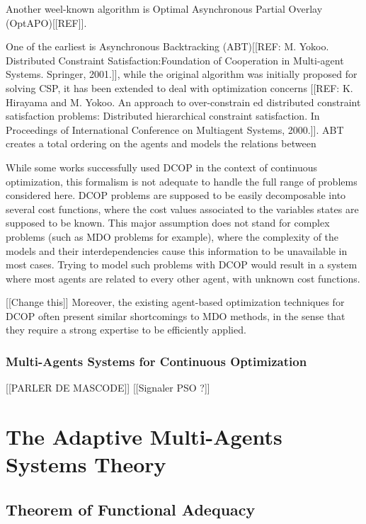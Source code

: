 Another weel-known algorithm is Optimal Asynchronous Partial Overlay (OptAPO)[[REF]]. 

 One of the earliest is Asynchronous Backtracking (ABT)[[REF: M. Yokoo. Distributed Constraint Satisfaction:Foundation of Cooperation in Multi-agent Systems. Springer, 2001.]], while the original algorithm was initially proposed for solving CSP, it has been extended to deal with optimization concerns [[REF: K. Hirayama and M. Yokoo. An approach to over-constrain ed distributed constraint satisfaction problems: Distributed hierarchical constraint satisfaction. In Proceedings of International Conference on Multiagent Systems, 2000.]]. ABT creates a total ordering on the agents and models the relations between 

While some works successfully used DCOP in the context of continuous optimization\cite{stranders2009decentralised}, this formalism is not adequate to handle the full range of problems considered here. DCOP problems are supposed to be easily decomposable into several cost functions, where the cost values associated to the variables states are supposed to be known. This major assumption does not stand for complex problems (such as MDO problems for example), where the complexity of the models and their interdependencies cause this information to be unavailable in most cases. Trying to model such problems with DCOP would result in a system where most agents are related to every other agent, with unknown cost functions.

[[Change this]]
Moreover, the existing agent-based optimization techniques for DCOP often present similar shortcomings to MDO methods, in the sense that they require a strong expertise to be efficiently applied\cite{Ka2011.6}.

\subsubsection{Multi-Agents Systems for Continuous Optimization}

[[PARLER DE MASCODE]]
[[Signaler PSO ?]]

\section{The Adaptive Multi-Agents Systems Theory}

\subsection{Theorem of Functional Adequacy}

